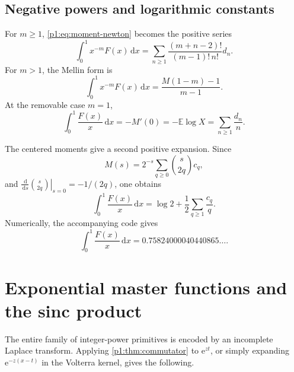 \documentclass[11pt,oneside]{article}
\theoremstyle{definition}
\theoremstyle{remark}
\newcommand{\E}{\mathbb E}
\newcommand{\dd}{\,\mathrm d}
\newcommand{\e}{\mathrm e}
\newcommand{\1}{\mathbf 1}
\begin{document}
\subsection{Negative powers and logarithmic constants}
For \(m\geq1\), \eqref{p1:eq:moment-newton} becomes the positive series
\begin{equation}
 \int_0^1x^{-m}F(x)\dd x
 =\sum_{n\geq1}\frac{(m+n-2)!}{(m-1)!\,n!}d_n.                 \label{p1:eq:negative-moment-series}
\end{equation}
For \(m>1\), the Mellin form is
\begin{equation}
 \int_0^1x^{-m}F(x)\dd x=\frac{M(1-m)-1}{m-1}.                \label{p1:eq:negative-M}
\end{equation}
At the removable case \(m=1\),
\begin{equation}
 \boxed{\quad
 \int_0^1\frac{F(x)}x\dd x
 =-M'(0)=-\E\log X
 =\sum_{n\geq1}\frac{d_n}{n}.
 \quad}                                                        \label{p1:eq:log-constant-d}
\end{equation}

The centered moments give a second positive expansion.  Since
\begin{equation}
 M(s)=2^{-s}\sum_{q\geq0}\binom{s}{2q}c_q,                     \label{p1:eq:M-centered}
\end{equation}
and \(\left.\frac{\dd}{\dd s}\binom{s}{2q}\right|_{s=0}
=-1/(2q)\), one obtains
\begin{equation}
 \boxed{\quad
 \int_0^1\frac{F(x)}x\dd x
 =\log2+\frac12\sum_{q\geq1}\frac{c_q}{q}.
 \quad}                                                        \label{p1:eq:log-constant-c}
\end{equation}
Numerically, the accompanying code gives
\begin{equation}
 \int_0^1\frac{F(x)}x\dd x
 =0.75824000040440865\ldots.                                  \label{p1:eq:log-constant-num}
\end{equation}

\section{Exponential master functions and the sinc product}

The entire family of integer-power primitives is encoded by an incomplete
Laplace transform.  Applying \cref{p1:thm:commutator} to \(\e^{zt}\), or simply
expanding \(\e^{-z(x-t)}\) in the Volterra kernel, gives the following.
\end{document}
